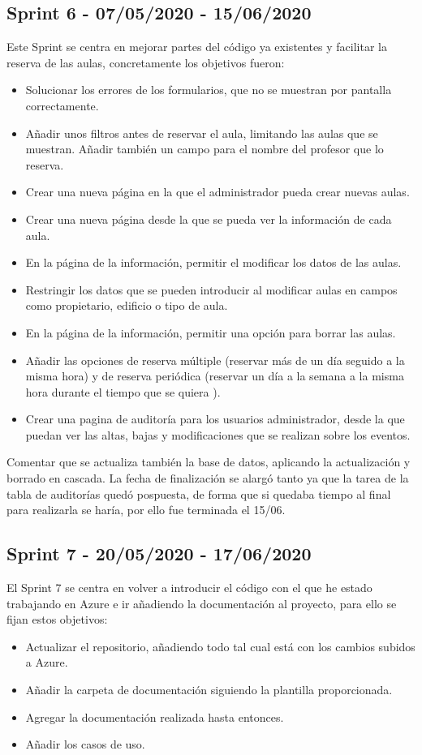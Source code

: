 \subsection{Sprint 6 - 07/05/2020 - 15/06/2020}
Este Sprint se centra en mejorar partes del código ya existentes y facilitar la reserva de las aulas, concretamente los objetivos fueron:
\begin{itemize}
    \item Solucionar los errores de los formularios, que no se muestran por pantalla correctamente.
    \item Añadir unos filtros antes de reservar el aula, limitando las aulas que se muestran. Añadir también un campo para el nombre del profesor que lo reserva.
    \item Crear una nueva página en la que el administrador pueda crear nuevas aulas.
    \item Crear una nueva página desde la que se pueda ver la información de cada aula.
    \item En la página de la información, permitir el modificar los datos de las aulas.
    \item Restringir los datos que se pueden introducir al modificar aulas en campos como propietario, edificio o tipo de aula.
    \item En la página de la información, permitir una opción para borrar las aulas.
    \item Añadir las opciones de reserva múltiple (reservar más de un día seguido a la misma hora) y de reserva periódica (reservar un día a la semana a la misma hora durante el tiempo que se quiera ).
    \item Crear una pagina de auditoría para los usuarios administrador, desde la que puedan ver las altas, bajas y modificaciones que se realizan sobre los eventos.
\end{itemize}
Comentar que se actualiza también la base de datos, aplicando la actualización y borrado en cascada.
La fecha de finalización se alargó tanto ya que la tarea de la tabla de auditorías quedó pospuesta, de forma que si quedaba tiempo al final para realizarla se haría, por ello fue terminada el 15/06.

\subsection{Sprint 7 - 20/05/2020 - 17/06/2020}
El Sprint 7 se centra en volver a introducir el código con el que he estado trabajando en Azure e ir añadiendo la documentación al proyecto, para ello se fijan estos objetivos:
\begin{itemize}
    \item Actualizar el repositorio, añadiendo todo tal cual está con los cambios subidos a Azure.
    \item Añadir la carpeta de documentación siguiendo la plantilla proporcionada.
    \item Agregar la documentación realizada hasta entonces.
    \item Añadir los casos de uso.
\end{itemize}

